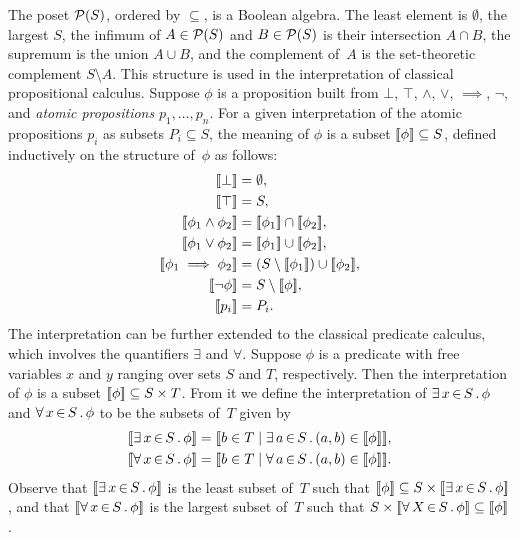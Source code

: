 The poset $\mathcal{P}(S)$, ordered by $\subseteq$, is a Boolean algebra. The
least element is $\emptyset$, the largest $S$, the infimum of $A \in
\mathcal{P}(S)$ and $B \in \mathcal{P}(S)$ is their intersection $A \cap B$, the
supremum is the union $A \cup B$, and the complement of~$A$ is the
set-theoretic complement $S \setminus A$. This structure is used in
the interpretation of classical propositional calculus. Suppose $\phi$
is a proposition built from $\bot$, $\top$, $\land$, $\lor$,
$\implies$, $\lnot$, and \emph{atomic propositions} $p_1, \ldots,
p_n$. For a given interpretation of the atomic propositions $p_i$ as
subsets $P_i \subseteq S$, the meaning of $\phi$ is a subset
$[\![\phi]\!] \subseteq S$, defined inductively on the structure
of~$\phi$ as follows:
%
\begin{align*}
  \sem{\bot} &= \emptyset,\\
  \sem{\top} &= S,\\
  \sem{\phi_1 \land \phi_2} &= \sem{\phi_1} \cap \sem{\phi_2},\\
  \sem{\phi_1 \lor \phi_2} &= \sem{\phi_1} \cup \sem{\phi_2},\\
  \sem{\phi_1 \implies \phi_2} &= (S \setminus \sem{\phi_1}) \cup \sem{\phi_2},\\
  \sem{\lnot \phi} &= S \setminus \sem{\phi},\\
  \sem{p_i} &= P_i.
\end{align*}
%
The interpretation can be further extended to the classical predicate
calculus, which involves the quantifiers $\exists$ and $\forall$.
Suppose $\phi$ is a predicate with free variables $x$ and $y$ ranging
over sets $S$ and $T$, respectively. Then the interpretation of $\phi$
is a subset $[\![\phi]\!] \subseteq S \times T$. From it we define the
interpretation of $\exists\, x \,{\in}\, S\,.\,\phi$ and $\forall\, x \,{\in}\, S\,.\,\phi$ to be
the subsets of~$T$ given by
%
\begin{align*}
  \sem{\xsome{x}{S}{\phi}} &=
  \sem{b \in T \such \xsome{a}{S}{(a,b) \in \sem{\phi}}}, \\
  \sem{\xall{x}{S}{\phi}} &=
  \sem{b \in T \such \xall{a}{S}{(a,b) \in \sem{\phi}}}.
\end{align*}
%
Observe that $[\![\exists\, x \,{\in}\, S\,.\,\phi]\!]$ is the least subset of~$T$
such that $[\![\phi]\!] \subseteq S \times [\![\exists\, x \,{\in}\, S\,.\,\phi]\!]$,
and that $[\![\forall\, x \,{\in}\, S\,.\,\phi]\!]$ is the largest subset of~$T$ such
that $S \times [\![\forall\, X \,{\in}\, S\,.\,\phi]\!] \subseteq [\![\phi]\!]$.

